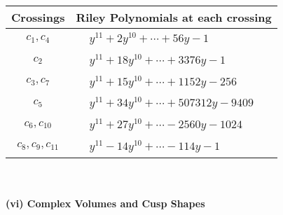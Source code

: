 \documentclass[1p]{elsarticle_modified}
\theoremstyle{definition}
\begin{document}
\begin{tabular}{m{50pt}|m{274pt}}
Crossings & \hspace{64pt}Riley Polynomials at each crossing \\
\hline $$\begin{aligned}c_{1},c_{4}\end{aligned}$$&$\begin{aligned}
&y^{11}+2 y^{10}+\cdots+56 y-1
\end{aligned}$\\
\hline $$\begin{aligned}c_{2}\end{aligned}$$&$\begin{aligned}
&y^{11}+18 y^{10}+\cdots+3376 y-1
\end{aligned}$\\
\hline $$\begin{aligned}c_{3},c_{7}\end{aligned}$$&$\begin{aligned}
&y^{11}+15 y^{10}+\cdots+1152 y-256
\end{aligned}$\\
\hline $$\begin{aligned}c_{5}\end{aligned}$$&$\begin{aligned}
&y^{11}+34 y^{10}+\cdots+507312 y-9409
\end{aligned}$\\
\hline $$\begin{aligned}c_{6},c_{10}\end{aligned}$$&$\begin{aligned}
&y^{11}+27 y^{10}+\cdots-2560 y-1024
\end{aligned}$\\
\hline $$\begin{aligned}c_{8},c_{9},c_{11}\end{aligned}$$&$\begin{aligned}
&y^{11}-14 y^{10}+\cdots-114 y-1
\end{aligned}$\\
\hline
\end{tabular}\\~\\
\newpage\flushleft \textbf{(vi) Complex Volumes and Cusp Shapes}
\end{document}
